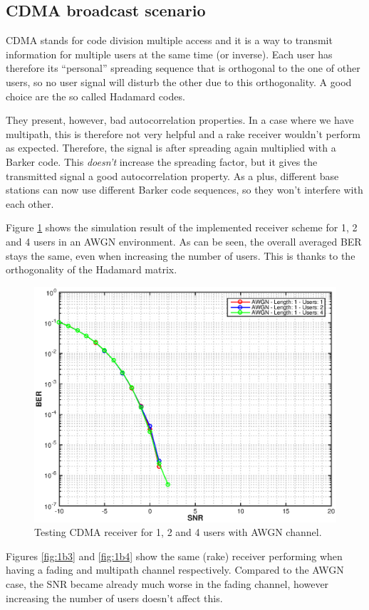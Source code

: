 \documentclass[a4paper]{article}
\begin{document}
\newpage 

\subsection{CDMA broadcast scenario}
CDMA stands for code division multiple access and it is a way to transmit information for multiple users at the same time (or inverse). Each user has therefore its ``personal'' spreading sequence that is orthogonal to the one of other users, so no user signal will disturb the other due to this orthogonality. A good choice are the so called Hadamard codes. 

They present, however, bad autocorrelation properties. In a case where we have multipath, this is therefore not very helpful and a rake receiver wouldn't perform as expected. Therefore, the signal is after spreading again multiplied with a Barker code. This \textit{doesn't} increase the spreading factor, but it gives the transmitted signal a good autocorrelation property. As a plus, different base stations can now use different Barker code sequences, so they won't interfere with each other.

Figure \ref{fig:1b2} shows the simulation result of the implemented receiver scheme for 1, 2 and 4 users in an AWGN environment. As can be seen, the overall averaged BER stays the same, even when increasing the number of users. This is thanks to the orthogonality of the Hadamard matrix.

\begin{figure}[htbp]
\begin{center}
\includegraphics[width=.6\textwidth]{img1/1b2.eps}
\caption{Testing CDMA receiver for 1, 2 and 4 users with AWGN channel.}
\label{fig:1b2}
\end{center}
\end{figure}


Figures \ref{fig:1b3} and \ref{fig:1b4} show the same (rake) receiver performing when having a fading and multipath channel respectively. Compared to the AWGN case, the SNR became already much worse in the fading channel, however increasing the number of users doesn't affect this.
\end{document}
